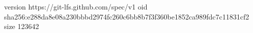version https://git-lfs.github.com/spec/v1
oid sha256:e288da8e08a230bbbd2974fc260c6bb8b7f3f360be1852ca989fdc7c11831cf2
size 123642
